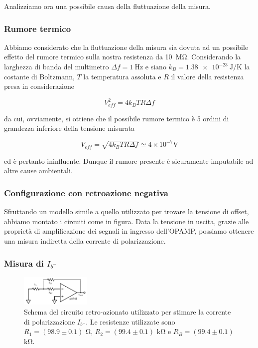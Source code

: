 Analizziamo ora una possibile causa della  fluttuazione della misura.

\subsubsection*{Rumore termico}

Abbiamo considerato che la fluttuazione della misura sia dovuta ad un possibile effetto del rumore termico sulla nostra resistenza da \SI{10}{\mega\ohm}. Considerando la larghezza di banda del multimetro $\Delta f = \SI{1}{\hertz}$ e siano $k_B = \SI{1.38e-23}{\joule\per\kelvin}$ la costante di Boltzmann, $T$ la temperatura assoluta e $R$ il valore della resistenza presa in considerazione

\begin{equation}
	V_{eff}^2 = 4 k_B T R \Delta f
\end{equation}

da cui, ovviamente, si ottiene che il possibile rumore termico è 5 ordini di grandezza inferiore della tensione misurata

\begin{equation}
	V_{eff} = \sqrt{4 k_B T R \Delta f} \simeq 4 \times 10^{-7} \si{\volt}
\end{equation}

ed è pertanto ininfluente. Dunque il rumore presente è sicuramente imputabile ad altre cause ambientali.

\subsubsection{Configurazione con retroazione negativa}

Sfruttando un modello simile a quello utilizzato per trovare la tensione di offset, abbiamo montato i circuiti come in figura. Data la tensione in uscita, grazie alle proprietà di amplificazione dei segnali in ingresso dell'OPAMP, possiamo ottenere una misura indiretta della corrente di polarizzazione.

\subsubsection*{Misura di $I_{b^-}$}

\begin{figure}
  \begin{center}
    \includegraphics[width=0.30\textwidth]{../E02/latex/inv_current.pdf}
  \end{center}
  \caption{Schema del circuito retro-azionato utilizzato per stimare la corrente di polarizzazione $I_{b^-}$. Le resistenze utilizzate sono $R_1=(98.9\pm0.1)$ \si{\ohm}, $R_2=(99.4\pm0.1)$ \si{\kilo\ohm} e $R_B=(99.4\pm0.1)$ \si{\kilo\ohm}.}
  \label{circuito:rel2_correnti_retroazione_inv}
\end{figure}

